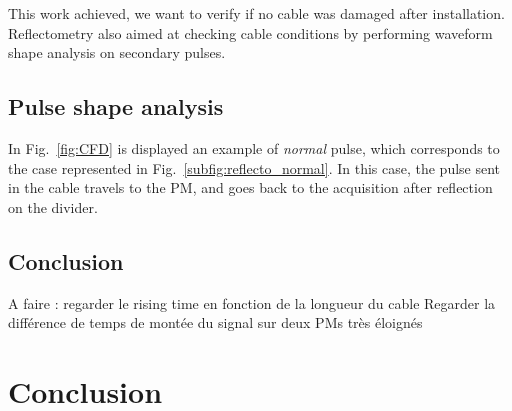 This work achieved, we want to verify if no cable was damaged after installation.
Reflectometry also aimed at checking cable conditions by performing waveform shape analysis on secondary pulses.

\subsection{Pulse shape analysis}
\label{subsec:pulse_shape}
In Fig.~\ref{fig:CFD} is displayed an example of \emph{normal} pulse, which corresponds to the case represented in Fig.~\ref{subfig:reflecto_normal}.
In this case, the pulse sent in the cable travels to the PM, and goes back to the acquisition after reflection on the divider.



\subsection{Conclusion}
A faire : regarder le rising time en fonction de la longueur du cable
Regarder la différence de temps de montée du signal sur deux PMs très éloignés




\section{Conclusion}
